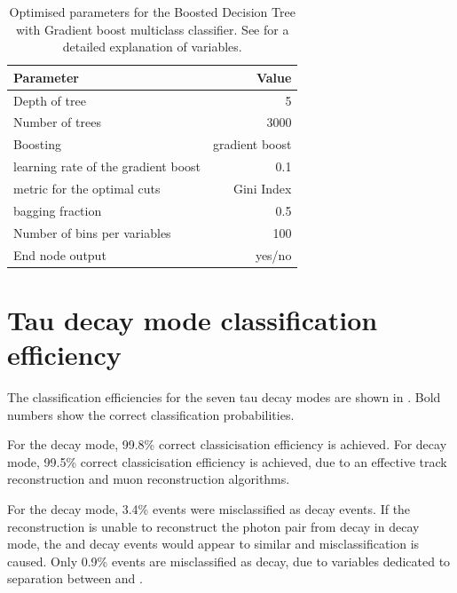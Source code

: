 \begin{table}[!tbp]\centering
\begin{tabular}{lr}
\hline \hline
 Parameter &  Value \\
\hline
Depth of tree & 5 \\
Number of trees & 3000 \\
Boosting & gradient boost \\
learning rate of the gradient boost & 0.1 \\
metric for the optimal cuts & Gini Index \\
bagging fraction & 0.5 \\
Number of bins per variables & 100 \\
End node output & yes/no \\
\hline \hline
\end{tabular}

\caption
{Optimised parameters for the Boosted Decision Tree with Gradient boost multiclass classifier. See  for a detailed explanation of variables.}
\label{tab:tauBDTparameters}
\end{table}


\section{Tau decay mode classification efficiency}
\label{sec:tauClassificationEff}
The classification efficiencies for the seven tau decay modes are shown in . Bold numbers show the correct classification probabilities.


For the \decayElectronShort decay mode,   99.8\%  correct classicisation efficiency is achieved. For \decayMuonShort decay mode,  99.5\% correct classicisation efficiency is achieved, due to an effective track reconstruction and muon reconstruction algorithms.

For the \decayPionShort decay mode, 3.4\% events were misclassified as \decayRhoShortest decay events. If the reconstruction is unable to reconstruct the photon pair from \Ppizero decay in \decayRhoShortest decay mode, the \decayPionShort and \decayRhoShortest decay events would appear to  similar and misclassification is caused. Only 0.9\% events are misclassified as \decayElectronShort decay, due to variables dedicated to separation between \Pem and \Ppiminus.


